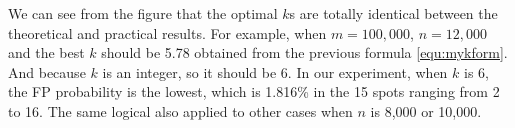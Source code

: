 
 
We can see from the figure that the optimal $k$s are totally identical between the theoretical and practical results. For example, when $m=100,000$, $n=12,000$ and the best $k$ should be 5.78 obtained from the previous formula \ref{equ:mykform}. And because $k$ is an integer, so it should be 6. In our experiment, when $k$ is 6, the FP probability is the lowest, which is 1.816\% in the 15 spots ranging from 2 to 16. The same logical also applied to other cases when $n$ is 8,000 or 10,000.


